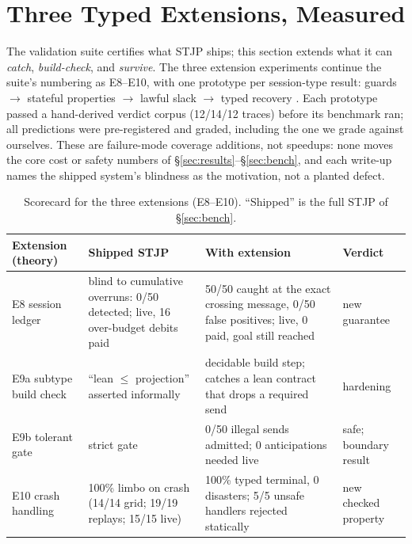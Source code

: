 \documentclass{article}
\newcommand{\stjp}{\textsc{STJP}}
\begin{document}
\section{Three Typed Extensions, Measured}\label{sec:ext}
The validation suite certifies what \stjp{} ships; this section extends what it can \emph{catch}, \emph{build-check}, and \emph{survive}. The three extension experiments continue the suite's numbering as E8--E10, with one prototype per session-type result: guards \citep{bocchi10} $\to$ stateful properties \citep{chen12} $\to$ lawful slack \citep{chen17,chen24} $\to$ typed recovery \citep{viering18}. Each prototype passed a hand-derived verdict corpus (12/14/12 traces) before its benchmark ran; all predictions were pre-registered and graded, including the one we grade against ourselves. These are failure-mode coverage additions, not speedups: none moves the core cost or safety numbers of \S\ref{sec:results}--\S\ref{sec:bench}, and each write-up names the shipped system's blindness as the motivation, not a planted defect.

\begin{table}[t]
\centering\small
\caption{Scorecard for the three extensions (E8--E10). ``Shipped'' is the full \stjp{} of \S\ref{sec:bench}.}
\label{tab:ext}
\begin{tabular}{@{}p{3.4cm}p{4.1cm}p{4.6cm}l@{}}
\toprule
\textbf{Extension (theory)} & \textbf{Shipped \stjp{}} & \textbf{With extension} & \textbf{Verdict} \\
\midrule
E8 session ledger \citep{chen12} & blind to cumulative overruns: 0/50 detected; live, 16 over-budget debits paid & 50/50 caught at the exact crossing message, 0/50 false positives; live, 0 paid, goal still reached & new guarantee \\
E9a subtype build check \citep{chen17} & ``lean $\leq$ projection'' asserted informally & decidable build step; catches a lean contract that drops a required send & hardening \\
E9b tolerant gate \citep{chen17,chen24} & strict gate & 0/50 illegal sends admitted; 0 anticipations needed live & safe; boundary result \\
E10 crash handling \citep{viering18} & 100\% limbo on crash (14/14 grid; 19/19 replays; 15/15 live) & 100\% typed terminal, 0 disasters; 5/5 unsafe handlers rejected statically & new checked property \\
\bottomrule
\end{tabular}
\end{table}
\end{document}
